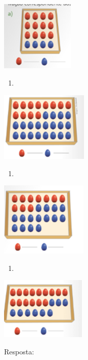 \includegraphics[width=1.37512in,height=1.31678in]{media/image118.png}

\begin{enumerate}
\def\labelenumi{\alph{enumi})}
\item
\end{enumerate}

\includegraphics[width=1.64181in,height=1.30845in]{media/image119.png}

\begin{enumerate}
\def\labelenumi{\alph{enumi})}
\item
\end{enumerate}

\includegraphics[width=1.63347in,height=1.39179in]{media/image120.png}

\begin{enumerate}
\def\labelenumi{\alph{enumi})}
\item
\end{enumerate}

\includegraphics[width=1.60014in,height=1.16677in]{media/image121.png}

Resposta:

